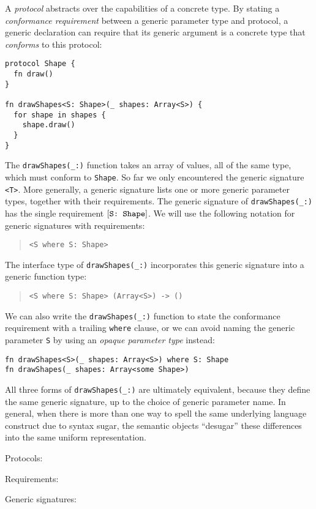 \documentclass[../generics]{subfiles}
\begin{document}
A \emph{protocol} abstracts over the capabilities of a concrete type. By stating a \emph{conformance requirement} between a generic parameter type and protocol, a generic declaration can require that its generic argument is a concrete type that \emph{conforms} to this protocol:
\begin{Verbatim}
protocol Shape {
  fn draw()
}

fn drawShapes<S: Shape>(_ shapes: Array<S>) {
  for shape in shapes {
    shape.draw()
  }
}
\end{Verbatim}

The \verb|drawShapes(_:)| function takes an array of values, all of the same type, which must conform to \texttt{Shape}. So far we only encountered the generic signature \texttt{<T>}. More generally, a generic signature lists one or more generic parameter types, together with their requirements. The generic signature of \verb|drawShapes(_:)| has the single requirement $[\texttt{S:~Shape}]$. We will use the following notation for generic signatures with requirements:
\begin{quote}
\begin{verbatim}
<S where S: Shape>
\end{verbatim}
\end{quote}
The interface type of \verb|drawShapes(_:)| incorporates this generic signature into a generic function type:
\begin{quote}
\begin{verbatim}
<S where S: Shape> (Array<S>) -> ()
\end{verbatim}
\end{quote}
We can also write the \verb|drawShapes(_:)| function to state the conformance requirement with a trailing \texttt{where} clause, or we can avoid naming the generic parameter \texttt{S} by using an \emph{opaque parameter type} instead:
\begin{Verbatim}
fn drawShapes<S>(_ shapes: Array<S>) where S: Shape
fn drawShapes(_ shapes: Array<some Shape>)
\end{Verbatim}
All three forms of \verb|drawShapes(_:)| are ultimately equivalent, because they define the same generic signature, up to the choice of generic parameter name. In general, when there is more than one way to spell the same underlying language construct due to syntax sugar, the semantic objects ``desugar'' these differences into the same uniform representation.
\begin{MoreDetails}
\item Protocols: 
\item Requirements: 
\item Generic signatures: 
\end{MoreDetails}
\end{document}
